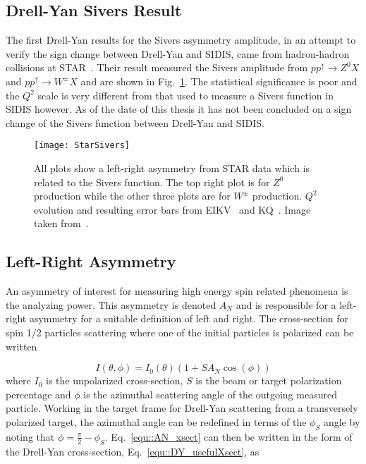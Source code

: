 \subsection{Drell-Yan Sivers Result}
The first Drell-Yan results for the Sivers asymmetry amplitude, in an attempt to
verify the sign change between Drell-Yan and SIDIS, came from hadron-hadron
collisions at STAR~\cite{PhysRevLett.116.132301}.  Their result measured the
Sivers amplitude from $pp^{\uparrow} \rightarrow Z^0X$ and $pp^{\uparrow}
\rightarrow W^{\pm}X$ and are shown in Fig.~\ref{fig::StarSivers}.  The
statistical significance is poor and the $Q^2$ scale is very different from that
used to measure a Sivers function in SIDIS however.  As of the date of this
thesis it has not been concluded on a sign change of the Sivers function between
Drell-Yan and SIDIS.

\begin{figure}[h!t]
  \centering
  \texttt{[image: StarSivers]}
  \caption{All plots show a left-right asymmetry from STAR data which is related
    to the Sivers function.  The top right plot is for $Z^0$ production while
    the other three plots are for $W^\pm$ production.  $Q^2$ evolution and
    resulting error bars from EIKV~\cite{PhysRevD.89.074013} and
    KQ~\cite{PhysRevLett.103.172001}.  Image taken
    from~\cite{PhysRevLett.116.132301}.}
  \label{fig::StarSivers}
\end{figure}

\subsection{Left-Right Asymmetry} \label{sec::lr_theory}
An asymmetry of interest for measuring high energy spin related phenomena is the
analyzing power.  This asymmetry is denoted $A_N$ and is responsible for a
left-right asymmetry for a suitable definition of left and right.  The
cross-section for spin 1/2 particles scattering where one of the initial
particles is polarized can be written

\begin{equation}
  \label{equ::AN_xsect}
  I(\theta, \phi) = I_0(\theta)(1+SA_N \cos(\phi))
\end{equation}
\noindent
where $I_0$ is the unpolarized cross-section, $S$ is the beam or target
polarization percentage and $\phi$ is the azimuthal scattering angle of the
outgoing measured particle.  Working in the target frame for Drell-Yan
scattering from a transversely polarized target, the azimuthal angle can be
redefined in terms of the $\phi_S$ angle by noting that $\phi = \frac{\pi}{2} -
\phi_S$. Eq.~\ref{equ::AN_xsect} can then be written in the form of the
Drell-Yan cross-section, Eq.~\ref{equ::DY_usefulXsect}, as

